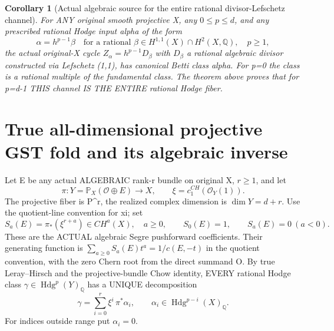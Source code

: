 \documentclass[11pt]{article}
\newtheorem{corollary}[theorem]{Corollary}
\begin{document}
\begin{corollary}[Actual algebraic source for the entire rational divisor-Lefschetz channel]
For ANY original smooth projective X, any
$0\le p\le d$, and any prescribed rational
Hodge input alpha of the form
\[
 \boxed{\alpha=h^{p-1}\beta
 \quad\text{for a rational }\beta\in H^{1,1}(X)
 \cap H^2(X,\mathbb Q),\quad p\ge1,}             \tag{3}
\]
the actual original-X cycle
$Z_\alpha=h^{p-1}D_\beta$
with $D_\beta$ a rational algebraic divisor
constructed via Lefschetz (1,1), has canonical
Betti class alpha. For p=0 the class is a
rational multiple of the fundamental class.
The theorem above proves that for p=d-1
THIS channel IS THE ENTIRE rational Hodge fiber.
\end{corollary}

\section{True all-dimensional projective GST fold and its algebraic inverse}
Let E be any actual ALGEBRAIC rank-r bundle on original X,
$r\ge1$, and let
\[
 \pi:Y=\mathbb P_X(\mathcal O\oplus E)\to X,
 \qquad \xi=c_1^{CH}(\mathcal O_Y(1)).
\]
The projective fiber is P^r, the realized
complex dimension is $\dim Y=d+r$.
Use the quotient-line convention for xi; set
\[
 S_a(E)=\pi_*(\xi^{r+a})\in CH^a(X),\quad a\ge0,
 \qquad S_0(E)=1,\qquad S_a(E)=0\ (a<0).
                                                               \tag{4}
\]
These are the ACTUAL algebraic Segre pushforward
coefficients. Their generating function is
$\sum_{a\ge0}S_a(E)t^a=1/c(E,-t)$
in the quotient convention, with the zero Chern
root from the direct summand O.
By true Leray--Hirsch and the projective-bundle
Chow identity, EVERY rational Hodge class
$\gamma\in\operatorname{Hdg}^p(Y)_{\mathbb Q}$
has a UNIQUE decomposition
\[
 \boxed{\gamma=\sum_{i=0}^r
       \xi^i\,\pi^*\alpha_i,\qquad
    \alpha_i\in\operatorname{Hdg}^{p-i}(X)_{\mathbb Q}.}
                                                               \tag{5}
\]
For indices outside range put $\alpha_i=0$.
\end{document}
